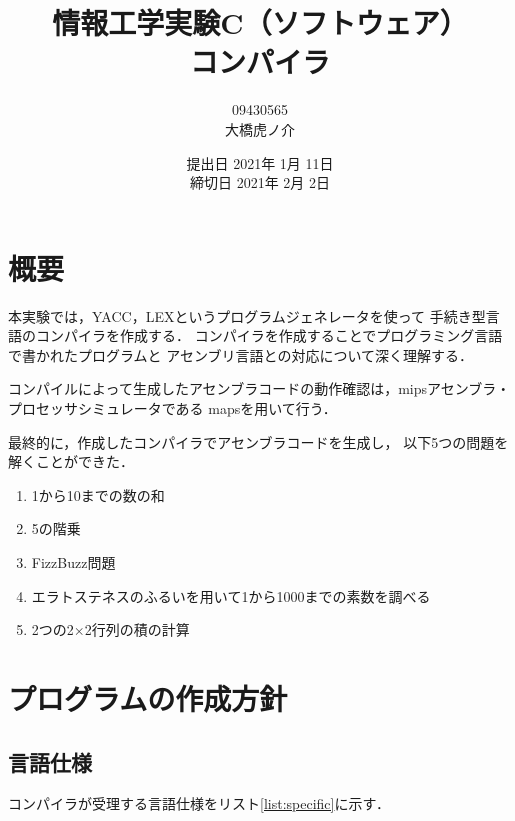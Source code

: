\documentclass[11pt]{jarticle}
\begin{document}
\title{情報工学実験C（ソフトウェア）\\コンパイラ}
\author{09430565\\大橋虎ノ介}
\date{提出日 2021年 1月 11日\\
締切日 2021年  2月 2日}

\maketitle
\newpage

\section{概要}\label{sec:abstract}

本実験では，YACC，LEXというプログラムジェネレータを使って
手続き型言語のコンパイラを作成する．
コンパイラを作成することでプログラミング言語で書かれたプログラムと
アセンブリ言語との対応について深く理解する．

コンパイルによって生成したアセンブラコードの動作確認は，mipsアセンブラ・プロセッサシミュレータである
mapsを用いて行う．

最終的に，作成したコンパイラでアセンブラコードを生成し，
以下5つの問題を解くことができた．

\begin{enumerate}
    \item 1から10までの数の和
    \item 5の階乗
    \item FizzBuzz問題
    \item エラトステネスのふるいを用いて1から1000までの素数を調べる
    \item 2つの2$\times$2行列の積の計算
\end{enumerate}

\section{プログラムの作成方針}\label{sec:policy}

\subsection{言語仕様} \label{sec:specific}

コンパイラが受理する言語仕様をリスト\ref{list:specific}に示す．
\end{document}
